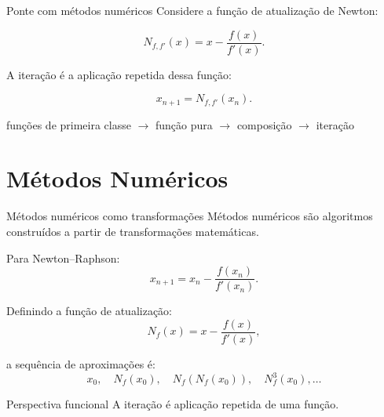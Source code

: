 \documentclass[aspectratio=169,11pt]{beamer}
\begin{document}
\begin{frame}{Ponte com métodos numéricos}
  Considere a função de atualização de Newton:

  \begin{equation}\label{eq:newton-pf}
    N_{f,f'}(x)
    =
    x-\frac{f(x)}{f'(x)}.
  \end{equation}

  A iteração é a aplicação repetida dessa função:

  \begin{equation}\label{eq:iteracao-newton-pf}
    x_{n+1}=N_{f,f'}(x_n).
  \end{equation}

  \begin{center}
    \small
    funções de primeira classe $\rightarrow$ função pura $\rightarrow$ composição $\rightarrow$ iteração
  \end{center}
\end{frame}

\section{Métodos Numéricos}

\begin{frame}{Métodos numéricos como transformações}
  Métodos numéricos são algoritmos construídos a partir de transformações matemáticas.

  Para Newton--Raphson:
  \begin{equation}\label{eq:newton-raphson}
    x_{n+1}=x_n-\frac{f(x_n)}{f'(x_n)}.
  \end{equation}

  Definindo a função de atualização:
  \begin{equation}\label{eq:funcao-atualizacao-newton}
    N_f(x)=x-\frac{f(x)}{f'(x)},
  \end{equation}

  a sequência de aproximações é:
  \begin{equation*}
    x_0,\quad N_f(x_0),\quad N_f(N_f(x_0)),\quad N_f^3(x_0),\ldots
  \end{equation*}

  \begin{block}{Perspectiva funcional}
    A iteração é aplicação repetida de uma função.
  \end{block}
\end{frame}
\end{document}
